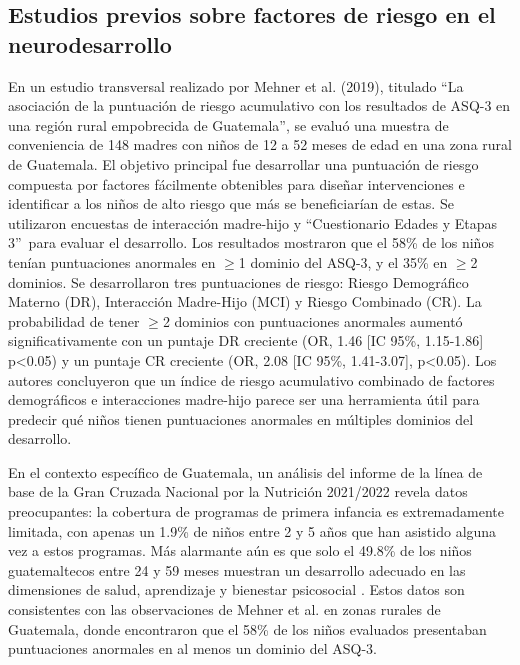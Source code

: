 \documentclass[11pt,letterpaper]{report}
\newcommand{\asq}{“Cuestionario Edades y Etapas 3”}
\begin{document}
\subsection{Estudios previos sobre factores de riesgo en el neurodesarrollo}
En un estudio transversal realizado por Mehner et al. (2019), titulado
``La asociación de la puntuación de riesgo acumulativo con los resultados de
ASQ-3 en una región rural empobrecida de Guatemala'', se evaluó una muestra de
conveniencia de 148 madres con niños de 12 a 52 meses de edad en una zona rural
de Guatemala. El objetivo principal fue desarrollar una puntuación de riesgo
compuesta por factores fácilmente obtenibles para diseñar intervenciones e
identificar a los niños de alto riesgo que más se beneficiarían de estas. Se
utilizaron encuestas de interacción madre-hijo y \asq\ para evaluar el
desarrollo. Los resultados mostraron que el 58\% de los niños tenían
puntuaciones anormales en $\ge$1 dominio del ASQ-3, y el 35\% en $\ge$2
dominios. Se desarrollaron tres puntuaciones de riesgo: Riesgo Demográfico
Materno (DR), Interacción Madre-Hijo (MCI) y Riesgo Combinado (CR). La
probabilidad de tener $\ge$2 dominios con puntuaciones anormales aumentó
significativamente con un puntaje DR creciente (OR, 1.46 [IC 95\%, 1.15-1.86]
p<0.05) y un puntaje CR creciente (OR, 2.08 [IC 95\%, 1.41-3.07], p<0.05). Los
autores concluyeron que un índice de riesgo acumulativo combinado de factores
demográficos e interacciones madre-hijo parece ser una herramienta útil para
predecir qué niños tienen puntuaciones anormales en múltiples dominios del
desarrollo. \cite{CMehner2019}

En el contexto específico de Guatemala, un análisis del informe de la  línea de
base de la Gran Cruzada Nacional por la Nutrición 2021/2022 revela  datos
preocupantes: la cobertura de programas de primera infancia es extremadamente
limitada, con apenas un 1.9\% de niños entre 2 y 5 años que han asistido alguna
vez a estos programas. Más alarmante aún es que solo el 49.8\% de los niños
guatemaltecos entre 24 y 59 meses muestran un desarrollo adecuado  en las
dimensiones de salud, aprendizaje y bienestar psicosocial \cite{SESAN2022}.
Estos datos son consistentes con las observaciones de Mehner et al.
\cite{CMehner2019} en zonas rurales de Guatemala, donde encontraron que el 58\%
de los niños evaluados presentaban puntuaciones anormales en al menos un
dominio del ASQ-3.
\end{document}
